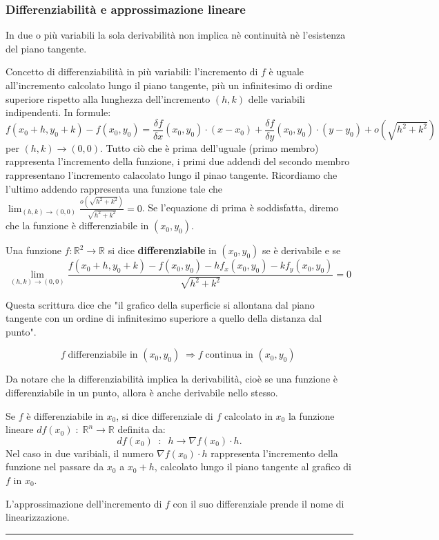 \subsubsection*{Differenziabilità e approssimazione lineare}
\begin{tcolorbox}
In due o più variabili la sola derivabilità non implica nè continuità nè l'esistenza del piano tangente.
\end{tcolorbox}
Concetto di differenziabilità in più variabili: l'incremento di $f$ è uguale all'incremento calcolato lungo il piano tangente, più un infinitesimo di ordine superiore rispetto alla lunghezza dell'incremento $(h,k)$ delle variabili indipendenti. In formule:
\[
    f(x_0 + h, y_0 + k) - f(x_0, y_0) = \frac{\delta f}{\delta x} (x_0,y_0) \cdot (x-x_0) + \frac{\delta f}{\delta y}(x_0, y_0) \cdot (y-y_0) + o(\sqrt{h^2 + k^2})
\]
per $(h,k) \rightarrow  (0,0)$.\newline
Tutto ciò che è prima dell'uguale (primo membro) rappresenta l'incremento della funzione, i primi due addendi del secondo membro rappresentano l'incremento calacolato lungo il pinao tangente. Ricordiamo che l'ultimo addendo rappresenta una funzione tale che $\lim_{(h,k)\rightarrow (0,0)}\frac{o(\sqrt{h^2 + k^2})}{\sqrt{h^2 + k^2}} = 0$.\newline
Se l'equazione di prima è soddisfatta, diremo che la funzione è differenziabile in $(x_0, y_0)$.\newline

\begin{tcolorbox}
    Una funzione $f: \mathbb{R}^2 \rightarrow  \mathbb{R}$ si dice \textbf{differenziabile} in $(x_0, y_0)$ se è derivabile e se
    \[
        \lim_{(h,k)\rightarrow (0,0)} \frac{f(x_0 + h, y_0+k)-f(x_0,y_0) - h f_x(x_0, y_0) - k f_y(x_0,y_0)}{\sqrt{h^2 + k^2}} = 0
    \]
\end{tcolorbox}
Questa scrittura dice che "il grafico della superficie si allontana dal piano tangente con un ordine di infinitesimo superiore a quello della distanza dal punto".
\newline
\begin{tcolorbox}
\[
    f \;\text{differenziabile in $(x_0, y_0)$}\; \Rightarrow f \; \text{continua in $(x_0,y_0)$}\;
\]
\end{tcolorbox}
Da notare che la differenziabilità implica la derivabilità, cioè se una funzione è differenziabile in un punto, allora è anche derivabile nello stesso.\newline

Se $f$ è differenziabile in $x_0$, si dice differenziale di $f$ calcolato in $x_0$ la funzione lineare $df(x_0) \;:\; \mathbb{R}^n \rightarrow  \mathbb{R}$ definita da:
\[
    df(x_0) \;\;:\;\;h \rightarrow  \nabla f(x_0) \cdot h.
\] 
Nel caso in due varibiali, il numero $\nabla f(x_0) \cdot h$ rappresenta l'incremento della funzione nel passare da $x_0$ a $x_0+h$, calcolato lungo il piano tangente al grafico di $f$ in $x_0$.\newline
\begin{tcolorbox}
L'approssimazione dell'incremento di $f$ con il suo differenziale prende il nome di linearizzazione.
\end{tcolorbox}
\rule{\textwidth}{0.4pt}

